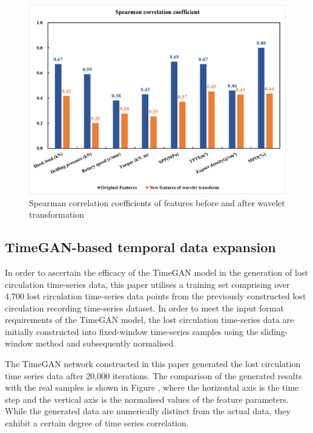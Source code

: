 \documentclass[journal,article,submit,pdftex,moreauthors]{Definitions/mdpi}
\begin{document}
\begin{figure}[h]
    \centering
    \includegraphics[width=0.75\linewidth]{图片/spearman相关系数.png}
    \caption{Spearman correlation coefficients of features before and after wavelet transformation}
    \label{fig:Spearman correlation coefficients of features before and after wavelet transformation}
\end{figure}
\subsection{TimeGAN-based temporal data expansion}

In order to ascertain the efficacy of the TimeGAN model in the generation of lost circulation time-series data, this paper utilises a training set comprising over 4,700 lost circulation time-series data points from the previously constructed lost circulation recording time-series dataset. In order to meet the input format requirements of the TimeGAN model, the lost circulation time-series data are initially constructed into fixed-window time-series samples using the sliding-window method and subsequently normalised. 

The TimeGAN network constructed in this paper generated the lost circulation time series data after 20,000 iterations. The comparison of the generated results with the real samples is shown in Figure   \label{fig:TimeGAN Generation of Lost Circulation Time Series Data}, where the horizontal axis is the time step and the vertical axis is the normalised values of the feature parameters. While the generated data are numerically distinct from the actual data, they exhibit a certain degree of time series correlation. 
\end{document}
